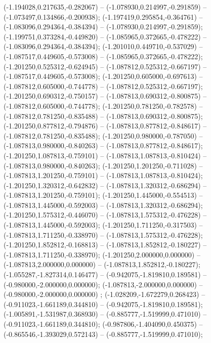  (-1.194028,0.217635,-0.282067) -- (-1.078930,0.214997,-0.291859) -- (-1.073497,0.134866,-0.200938);
 (-1.197419,0.295854,-0.364761) -- (-1.083096,0.294364,-0.384394) -- (-1.078930,0.214997,-0.291859);
 (-1.199751,0.373284,-0.449820) -- (-1.085965,0.372665,-0.478222) -- (-1.083096,0.294364,-0.384394);
 (-1.201010,0.449710,-0.537029) -- (-1.087517,0.449605,-0.573008) -- (-1.085965,0.372665,-0.478222);
 (-1.201250,0.525312,-0.624945) -- (-1.087812,0.525312,-0.667197) -- (-1.087517,0.449605,-0.573008);
 (-1.201250,0.605000,-0.697613) -- (-1.087812,0.605000,-0.744778) -- (-1.087812,0.525312,-0.667197);
 (-1.201250,0.690312,-0.750157) -- (-1.087813,0.690312,-0.800875) -- (-1.087812,0.605000,-0.744778);
 (-1.201250,0.781250,-0.782578) -- (-1.087812,0.781250,-0.835488) -- (-1.087813,0.690312,-0.800875);
 (-1.201250,0.877812,-0.794876) -- (-1.087813,0.877812,-0.848617) -- (-1.087812,0.781250,-0.835488);
 (-1.201250,0.980000,-0.787050) -- (-1.087813,0.980000,-0.840263) -- (-1.087813,0.877812,-0.848617);
 (-1.201250,1.087813,-0.759101) -- (-1.087813,1.087813,-0.810424) -- (-1.087813,0.980000,-0.840263);
 (-1.201250,1.201250,-0.711028) -- (-1.087813,1.201250,-0.759101) -- (-1.087813,1.087813,-0.810424);
 (-1.201250,1.320312,-0.642832) -- (-1.087813,1.320312,-0.686294) -- (-1.087813,1.201250,-0.759101);
 (-1.201250,1.445000,-0.554513) -- (-1.087813,1.445000,-0.592003) -- (-1.087813,1.320312,-0.686294);
 (-1.201250,1.575312,-0.446070) -- (-1.087813,1.575312,-0.476228) -- (-1.087813,1.445000,-0.592003);
 (-1.201250,1.711250,-0.317503) -- (-1.087813,1.711250,-0.338970) -- (-1.087813,1.575312,-0.476228);
 (-1.201250,1.852812,-0.168813) -- (-1.087813,1.852812,-0.180227) -- (-1.087813,1.711250,-0.338970);
 (-1.201250,2.000000,0.000000) -- (-1.087813,2.000000,0.000000) -- (-1.087813,1.852812,-0.180227);
 (-1.055287,-1.827314,0.146477) -- (-0.942075,-1.819810,0.189581) -- (-0.980000,-2.000000,0.000000);
 (-1.087813,-2.000000,0.000000) -- (-0.980000,-2.000000,0.000000) ;
 (-1.028209,-1.672279,0.268423) -- (-0.911023,-1.661189,0.344810) -- (-0.942075,-1.819810,0.189581);
 (-1.005891,-1.531987,0.368930) -- (-0.885777,-1.519999,0.471010) -- (-0.911023,-1.661189,0.344810);
 (-0.987806,-1.404090,0.450375) -- (-0.865546,-1.393029,0.572143) -- (-0.885777,-1.519999,0.471010);
